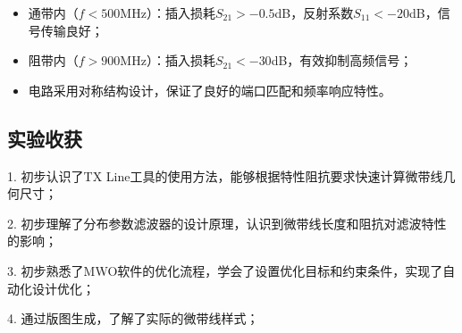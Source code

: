 \documentclass[12pt,hyperref,a4paper,UTF8]{ctexart}
\begin{document}
\begin{itemize}
    \item 通带内（$f < 500$MHz）：插入损耗$S_{21} > -0.5$dB，反射系数$S_{11} < -20$dB，信号传输良好；
    \item 阻带内（$f > 900$MHz）：插入损耗$S_{21} < -30$dB，有效抑制高频信号；
    \item 电路采用对称结构设计，保证了良好的端口匹配和频率响应特性。
\end{itemize}

\subsection{实验收获}

1. 初步认识了TX Line工具的使用方法，能够根据特性阻抗要求快速计算微带线几何尺寸；

2. 初步理解了分布参数滤波器的设计原理，认识到微带线长度和阻抗对滤波特性的影响；

3. 初步熟悉了MWO软件的优化流程，学会了设置优化目标和约束条件，实现了自动化设计优化；

4. 通过版图生成，了解了实际的微带线样式；
\end{document}
